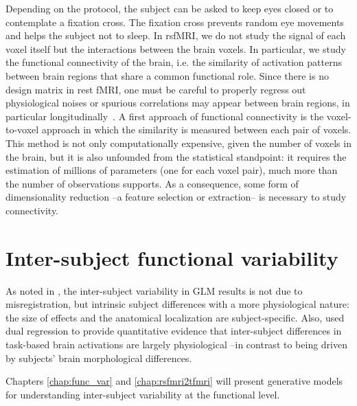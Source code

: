 Depending on the protocol, the subject can be asked to keep eyes closed or
to contemplate a fixation cross. The fixation cross prevents random eye movements
and helps the subject not to sleep.
In rsfMRI, we do not study the signal of each voxel itself but the
interactions between the brain voxels. In particular, we study the functional
connectivity of the brain, i.e. the similarity of activation patterns between
brain regions that share a common functional role. Since there is no design
matrix in rest fMRI, one must be careful to properly regress out physiological
noises or spurious correlations may appear between brain regions, in particular
longitudinally~\citep{power2012,vandijk2012}.
A first approach of functional connectivity is the voxel-to-voxel approach in
which the similarity is measured between each pair of voxels. This method is
not only computationally expensive, given the number of voxels in the brain,
but it is also unfounded from the statistical standpoint: it requires the
estimation of millions of parameters (one for each voxel pair), much more than the number of observations
supports. As a consequence, some form of dimensionality reduction --a feature
selection or extraction-- is necessary to study connectivity.



\section{Inter-subject functional variability}
As noted in
\citep{thirion2007analysis,pmid22425669,Xu2009}, the inter-subject variability
in GLM results is not due to misregistration, but intrinsic subject
differences with a more physiological nature: the size of effects and
the anatomical localization are subject-specific. Also, \citep{tavor2016task} used
dual regression \citep{Filippini2009} to provide quantitative evidence that inter-subject
differences in task-based brain activations are largely physiological --in contrast to being driven
by subjects' brain morphological differences.

Chapters \ref{chap:func_var} and \ref{chap:rsfmri2tfmri} will present generative models for understanding inter-subject variability at the functional level.


